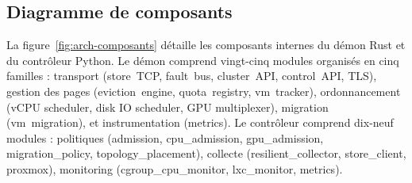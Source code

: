 \subsection{Diagramme de composants}

La figure~\ref{fig:arch-composants} détaille les composants internes du démon Rust et du contrôleur Python. Le démon comprend vingt-cinq modules organisés en cinq familles : transport (store~TCP, fault~bus, cluster~API, control~API, TLS), gestion des pages (eviction~engine, quota~registry, vm~tracker), ordonnancement (vCPU scheduler, disk IO scheduler, GPU multiplexer), migration (vm~migration), et instrumentation (metrics). Le contrôleur comprend dix-neuf modules : politiques (admission, cpu\_admission, gpu\_admission, migration\_policy, topology\_placement), collecte (resilient\_collector, store\_client, proxmox), monitoring (cgroup\_cpu\_monitor, lxc\_monitor, metrics).

